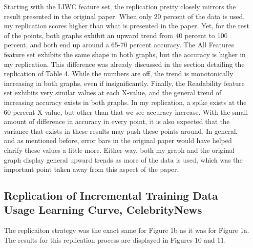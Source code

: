 \documentclass{article}
\begin{document}
Starting with the LIWC feature set, the replication pretty closely mirrors the result presented in the original paper. When only 20 percent of the data is used, my replication scores  higher than what is presented in the paper. Yet, for the rest of the points, both graphs exhibit an upward trend from 40 percent to 100 percent, and both end up around a 65-70 percent accuracy. The All Features feature set exhibits the same shape in both graphs, but the accuracy is higher in my replication. This difference was already discussed in the section detailing the replication of Table 4. While the numbers are off, the trend is monotonically increasing in both graphs, even if insignificantly. Finally, the Readability feature set exhibits very similar values at each X-value, and the general trend of increasing accuracy exists in both graphs. In my replication, a spike exists at the 60 percent X-value, but other than that we see accuracy increase. With the small amount of difference in accuracy in every point, it is also expected that the variance that exists in these results may push these points around. In general, and as mentioned before, error bars in the original paper would have helped clarify these values a little more. Either way, both my graph and the original graph display general upward trends as more of the data is used, which was the important point taken away from this aspect of the paper.

\subsection{Replication of Incremental Training Data Usage Learning Curve, CelebrityNews}

The replicaiton strategy was the exact same for Figure 1b as it was for Figure 1a. The results for this replication process are displayed in Figures 10 and 11.
\end{document}
